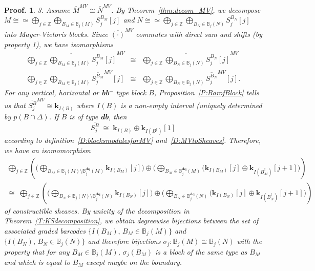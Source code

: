 \documentclass[a4paper, english, 11pt]{article}
\newcommand{\kk}[0]{\textbf{k}}
\newcommand{\0}{\vec{0}}
\newcommand{\Z}[0]{\mathbb{Z}}
\newtheorem*{pf}{Proof.} }
\begin{document}
\begin{pf}
3. Assume $\overline{M}^{MV} \cong \overline{N}^{MV}$. By Theorem~\ref{thm:decom_MV}, we decompose 
$M\cong \simeq \bigoplus_{j\in \Z} \bigoplus_{B_M \in \mathbb{B}_j(M)}S_j^{B_M}[j]$ and 
$N \cong \simeq \bigoplus_{j\in \Z} \bigoplus_{B_N \in \mathbb{B}_j(N)}S_j^{B_N}[j]$ into  Mayer-Vietoris blocks.
Since $\overline{(\cdot)}^{MV}$ commutes with direct 
sum and shifts (by property 1),  we have isomorphisms
\begin{eqnarray*}
 \overline{ \bigoplus_{j\in \Z} \bigoplus_{B_M\in \mathbb{B}_j(M)}S_j^{B_M}[j]}^{MV} &\cong&
 \overline{\bigoplus_{j\in \Z} \bigoplus_{B_N\in \mathbb{B}_j(N)}S_j^{B_N}[j] }^{MV}  \\ 
 \bigoplus_{j\in \Z} \bigoplus_{B_M\in \mathbb{B}_j(M)} \overline{S_j^{B_M}}^{MV}[j] &\cong& 
 \bigoplus_{j\in \Z} \bigoplus_{B_N\in \mathbb{B}_j(N)} \overline{S_j^{B_N} }^{MV}[j].
\end{eqnarray*}
For any vertical, horizontal or \textbf{bb}$^-$ type block $B$, Proposition~\ref{P:BarofBlock} tells us that  
$\overline{S_j^{B}}^{MV} \cong \kk_{I(B)}$ where $I(B)$ is a non-empty interval (uniquely determined by $p(B\cap \Delta)$. 
If $B$ is of type \textbf{db}, then 
$$
 \overline{S_j^{B}} \; \cong \;  \kk_{I(B)} \oplus \kk_{I(B^\dag)}[1]
$$
according to definition~\ref{D:blocksmodulesforMV} and~\ref{D:MVtoSheaves}.  
Therefore, we have an isomomorphism 
\begin{multline}
 \label{eq:decofBarMV} 
 \bigoplus_{j\in \Z} \left(\Big(\bigoplus_{B_M\in \mathbb{B}_j(M)\setminus \mathbb{B}^{\textbf{dq}}_j(M)} \kk_{I(B_M)}[j] \Big) \oplus 
 \Big(\bigoplus_{B_M\in \mathbb{B}^{\textbf{dq}}_j(M) } \big(\kk_{I(B_M)}[j] \oplus \kk_{I(B_M^\dag)}[j+1]\Big)\right)\\
 \cong \; 
 \bigoplus_{j\in \Z} \left(\Big(\bigoplus_{B_N\in \mathbb{B}_j(N) \setminus \mathbb{B}^{\textbf{dq}}_j(N)} \kk_{I(B_N)}[j]\Big)\oplus 
\Big( \bigoplus_{B_N\in \mathbb{B}^{\textbf{dq}}_j(N) } \big(\kk_{I(B_N)}[j] \oplus \kk_{I(B_N^\dag)}[j+1]\Big)\right)
\end{multline}
of constructible sheaves. By unicity of the decomposition in Theorem~\ref{T:KSdecomposition}, we obtain  degreewise bijections between 
the set of associated graded barcodes $\{ I(B_M), \, B_M \in  \mathbb{B}_j(M)\}$ and $\{ I(B_N), \, B_N \in  \mathbb{B}_j(N)\}$
and therefore  bijections $\sigma_j: \mathbb{B}_j(M) \cong \mathbb{B}_j(N)$ with the property that  for any $B_M\in \mathbb{B}_j(M)$, 
$\sigma_j(B_M)$ is a block of the same type as $B_M$ and which is equal to $B_M$ except maybe on the boundary.




\end{pf}
\end{document}
